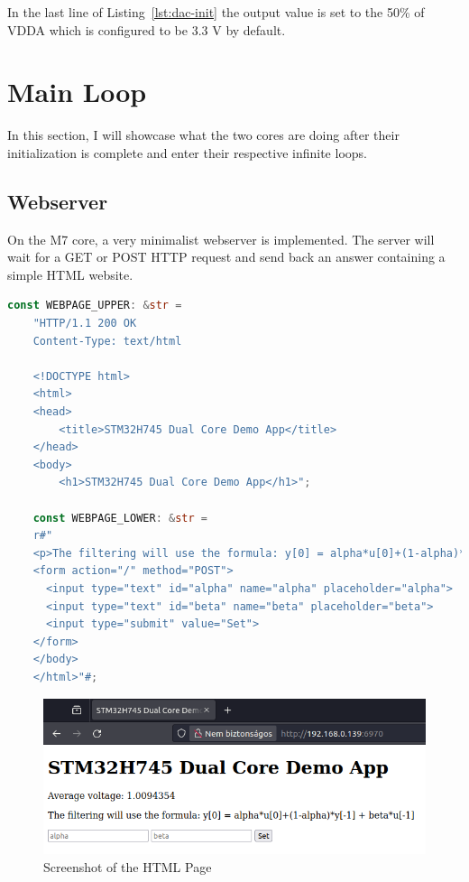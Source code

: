 In the last line of Listing~\ref{lst:dac-init} the output value is set to the 50\% of VDDA which is configured to be 3.3 V by default.

\section{Main Loop}

In this section, I will showcase what the two cores are doing after their initialization is complete and enter their respective infinite loops.

\subsection{Webserver}

On the M7 core, a very minimalist webserver is implemented. The server will wait for a GET or POST HTTP request and send back an answer containing a simple HTML website.

\begin{lstlisting}[language=Rust,frame=single,float=!ht,style=customrust,label={lst:html-strings},caption={HTML Page Defined in a String}]
    const WEBPAGE_UPPER: &str =
    "HTTP/1.1 200 OK
    Content-Type: text/html

    <!DOCTYPE html>
    <html>
    <head>
        <title>STM32H745 Dual Core Demo App</title>
    </head>
    <body>
        <h1>STM32H745 Dual Core Demo App</h1>";

    const WEBPAGE_LOWER: &str =
    r#"
    <p>The filtering will use the formula: y[0] = alpha*u[0]+(1-alpha)*y[-1] + beta*u[-1]
    <form action="/" method="POST">
      <input type="text" id="alpha" name="alpha" placeholder="alpha">
      <input type="text" id="beta" name="beta" placeholder="beta">
      <input type="submit" value="Set">
    </form>
    </body>
    </html>"#;
\end{lstlisting}

\begin{figure}[!ht]
    \centering
    \includegraphics[width=150mm, keepaspectratio]{figures/webpage.png}
    \caption{Screenshot of the HTML Page}
    \label{fig:html-page}
\end{figure}

